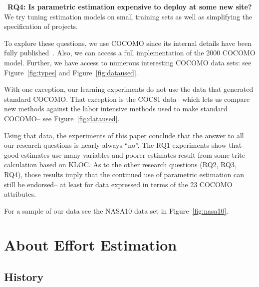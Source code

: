\documentclass[smallcondesed]{svjour3}
\newcommand{\fig}[1]{Figure~\ref{fig:#1}}
\newenvironment{BLUE}{\color{black}}{\ignorespacesafterend}
\newcommand{\HERE}[1]{}
\begin{document}
~{\bf RQ4: Is parametric estimation expensive to deploy  at some new site?}
We try   tuning estimation models on  small training sets 
as well as simplifying the specification of  projects.

 
 
To explore these questions, we use  COCOMO since its
internal details have been fully
published~\cite{boehm00b}. Also, we can access a full implementation of the  2000
COCOMO model.
Further, we have access to numerous interesting  COCOMO data
sets: see \fig{types} and \fig{dataused}.
\begin{BLUE}
\HERE{Reviewer2a}
With one exception, our learning experiments do not use the data
that generated   standard COCOMO.
That exception is the  COC81 data-- which  lets us  compare new methods
against the  labor intensive methods used to make standard COCOMO-- see 
\fig{dataused}.
\end{BLUE}
 
 
Using that data,  the experiments of this paper conclude that
the answer to all  our  research questions is nearly always
``no''.  
The RQ1 experiments show that good estimates use many variables
and  poorer estimates result from   some trite calculation based on KLOC.   
%
As to the other research questions (RQ2, RQ3, RQ4), those results imply that 
the continued
use of parametric estimation can still be endorsed-- at least for data expressed
in terms of the 23 COCOMO attributes. 

For a sample of our data  see the NASA10 data set in \fig{nasa10}.

 \section{About Effort Estimation}
 \subsection{History}
\end{document}
